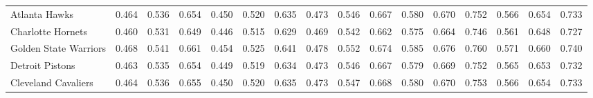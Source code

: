 \documentclass[11pt,a4paper]{article}
\begin{document}
\begin{table}[H]
\begin{tabular}{l ccc ccc ccc ccc ccc}
Atlanta Hawks & 0.464 & 0.536 & 0.654 & 0.450 & 0.520 & 0.635 & 0.473 & 0.546 & 0.667 & 0.580 & 0.670 & 0.752 & 0.566 & 0.654 & 0.733 \\
Charlotte Hornets & 0.460 & 0.531 & 0.649 & 0.446 & 0.515 & 0.629 & 0.469 & 0.542 & 0.662 & 0.575 & 0.664 & 0.746 & 0.561 & 0.648 & 0.727 \\
Golden State Warriors & 0.468 & 0.541 & 0.661 & 0.454 & 0.525 & 0.641 & 0.478 & 0.552 & 0.674 & 0.585 & 0.676 & 0.760 & 0.571 & 0.660 & 0.740 \\
Detroit Pistons & 0.463 & 0.535 & 0.654 & 0.449 & 0.519 & 0.634 & 0.473 & 0.546 & 0.667 & 0.579 & 0.669 & 0.752 & 0.565 & 0.653 & 0.732 \\
Cleveland Cavaliers & 0.464 & 0.536 & 0.655 & 0.450 & 0.520 & 0.635 & 0.473 & 0.547 & 0.668 & 0.580 & 0.670 & 0.753 & 0.566 & 0.654 & 0.733 \\
\bottomrule
\end{tabular}
\end{table}
\end{document}
